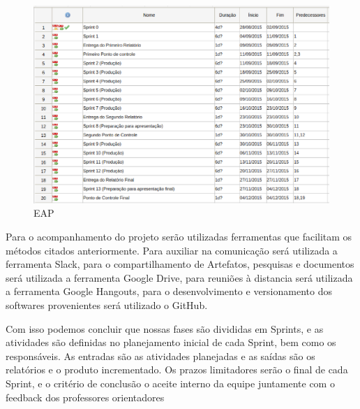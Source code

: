 \begin{figure}[!htb]
\centering
  \includegraphics[keepaspectratio=true,scale=0.5]{figuras/metodologia/cronograma}
\caption{EAP}
\label{fig:cronograma}
\end{figure}

Para o acompanhamento do projeto serão utilizadas ferramentas que facilitam os métodos citados anteriormente. Para auxiliar na comunicação será utilizada a ferramenta Slack, para o compartilhamento de Artefatos, pesquisas e documentos será utilizada a ferramenta Google Drive, para reuniões à distancia será utilizada a ferramenta Google Hangouts, para o desenvolvimento  e versionamento dos softwares provenientes será utilizado o GitHub.

Com isso podemos concluir que nossas fases são divididas em Sprints, e as atividades são definidas no planejamento inicial de cada Sprint, bem como os responsáveis. As entradas são as atividades planejadas e as saídas são os relatórios e o produto incrementado. Os prazos limitadores serão o final de cada Sprint, e o critério de conclusão o aceite interno da equipe juntamente com o feedback dos professores orientadores
